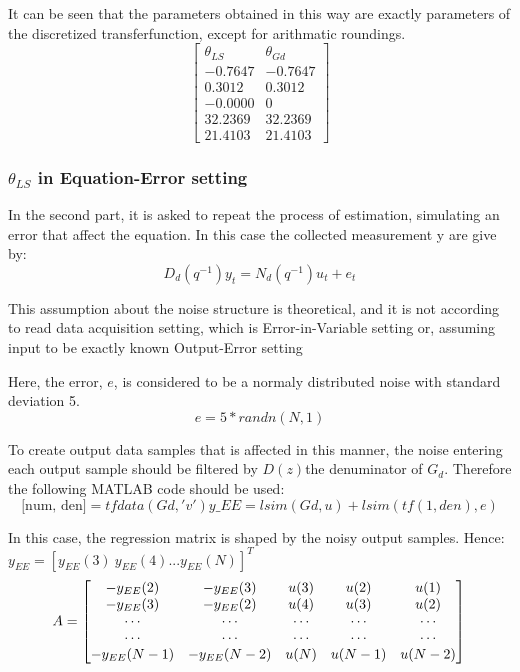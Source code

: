 It can be seen that the parameters obtained in this way are exactly parameters of the discretized transferfunction, except for arithmatic roundings.
\[
\begin{bmatrix}
    \theta_{LS} & \theta_{Gd} \\
    -0.7647 & -0.7647 \\
     0.3012 & 0.3012 \\
    -0.0000 & 0 \\
    32.2369 & 32.2369 \\
    21.4103 & 21.4103
\end{bmatrix}
\]

\subsubsection{\(\theta_{LS}\) in Equation-Error setting}
In the second part, it is asked to repeat the process of estimation, simulating an error that affect the equation. In this case the collected measurement y are give by:
\[
D_d(q^{-1})y_t = N_d(q^{-1})u_t + e_t
\]
\begin{QandAbox}
This assumption about the noise structure is theoretical, and it is not according to read data acquisition setting, which is Error-in-Variable setting or, assuming input to be exactly known Output-Error setting
\end{QandAbox}
Here, the error, \(e\), is considered to be a normaly distributed noise with standard deviation 5.
\[
e = 5 * randn(N,1)
\]

To create output data samples that is affected in this manner, the noise entering each output sample should be filtered by \(D(z)\)the denuminator of \(G_d\). Therefore the following MATLAB code should be used:
\[
\text{[num, den]} = tfdata(Gd, 'v')
y\_EE = lsim(Gd,u) + lsim(tf(1,den),e)
\]

In this case, the regression matrix is shaped by the noisy output samples. Hence:
\(y_{EE} = [y_{EE}(3) \: y_{EE}(4) ... y_{EE}(N)]^T 
\)
\[
    A = \left[
    \begin{matrix}
    -y_{EE}(2) & -y_{EE}(3) & u(3) & u(2) & u(1) \\
    -y_{EE}(3) & -y_{EE}(2) & u(4) & u(3) & u(2) \\
    \cdots & \cdots & \cdots & \cdots & \cdots   \\
    \cdots & \cdots & \cdots & \cdots & \cdots   \\
    -y_{EE}(N-1) & -y_{EE}(N-2) & u(N) & u(N-1) & u(N-2)
    \end{matrix} 
    \right]\\
\]

